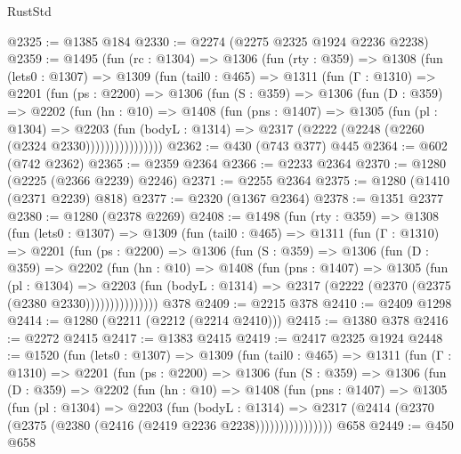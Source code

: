 \begin{lexlean}{RustStd}
\begin{coremodule}
@2325 := @1385 @184
@2330 := @2274 (@2275 @2325 @1924 @2236 @2238)
@2359 := @1495
    (fun (rc : @1304) =>
    @1306
      (fun (rty : @359) =>
      @1308
        (fun (lets0 : @1307) =>
        @1309
          (fun (tail0 : @465) =>
          @1311
            (fun (Γ : @1310) =>
            @2201
              (fun (ps : @2200) =>
              @1306
                (fun (S : @359) =>
                @1306
                  (fun (D : @359) =>
                  @2202
                    (fun (hn : @10) =>
                    @1408
                      (fun (pns : @1407) =>
                      @1305
                        (fun (pl : @1304) =>
                        @2203
                          (fun (bodyL : @1314) =>
                          @2317 (@2222 (@2248 (@2260 (@2324 @2330))))))))))))))))
@2362 := @430 (@743 @377) @445
@2364 := @602 (@742 @2362)
@2365 := @2359 @2364
@2366 := @2233 @2364
@2370 := @1280 (@2225 (@2366 @2239) @2246)
@2371 := @2255 @2364
@2375 := @1280 (@1410 (@2371 @2239) @818)
@2377 := @2320 (@1367 @2364)
@2378 := @1351 @2377
@2380 := @1280 (@2378 @2269)
@2408 := @1498
    (fun (rty : @359) =>
    @1308
      (fun (lets0 : @1307) =>
      @1309
        (fun (tail0 : @465) =>
        @1311
          (fun (Γ : @1310) =>
          @2201
            (fun (ps : @2200) =>
            @1306
              (fun (S : @359) =>
              @1306
                (fun (D : @359) =>
                @2202
                  (fun (hn : @10) =>
                  @1408
                    (fun (pns : @1407) =>
                    @1305
                      (fun (pl : @1304) =>
                      @2203
                        (fun (bodyL : @1314) =>
                        @2317 (@2222 (@2370 (@2375 (@2380 @2330)))))))))))))))
    @378
@2409 := @2215 @378
@2410 := @2409 @1298
@2414 := @1280 (@2211 (@2212 (@2214 @2410)))
@2415 := @1380 @378
@2416 := @2272 @2415
@2417 := @1383 @2415
@2419 := @2417 @2325 @1924
@2448 := @1520
    (fun (lets0 : @1307) =>
    @1309
      (fun (tail0 : @465) =>
      @1311
        (fun (Γ : @1310) =>
        @2201
          (fun (ps : @2200) =>
          @1306
            (fun (S : @359) =>
            @1306
              (fun (D : @359) =>
              @2202
                (fun (hn : @10) =>
                @1408
                  (fun (pns : @1407) =>
                  @1305
                    (fun (pl : @1304) =>
                    @2203
                      (fun (bodyL : @1314) =>
                      @2317 (@2414 (@2370 (@2375 (@2380 (@2416 (@2419 @2236 @2238))))))))))))))))
    @658
@2449 := @450 @658

\end{coremodule}
\end{lexlean}
